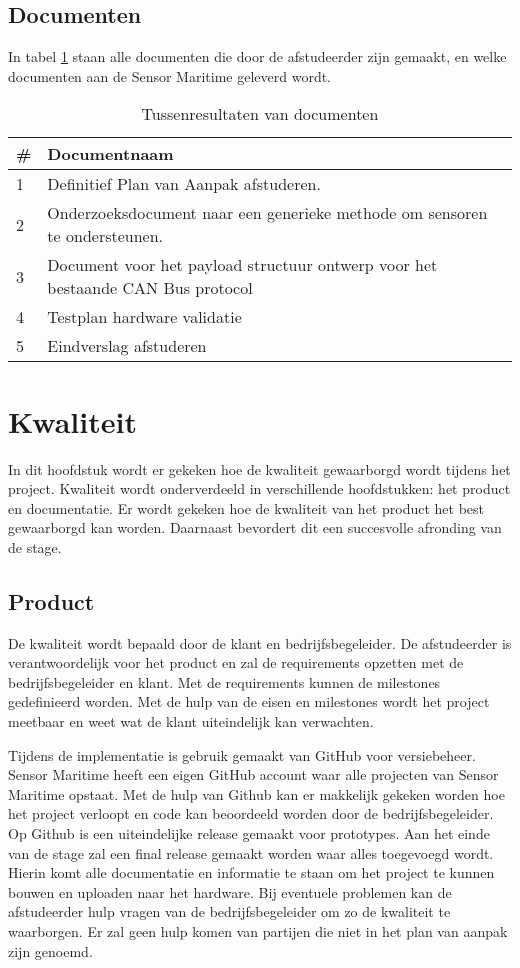 \subsection{Documenten}
In tabel \ref{tab:documents} staan  alle documenten die door de afstudeerder zijn gemaakt, en welke documenten aan de Sensor Maritime geleverd wordt.
\begin{table}[h!] 
	\caption{Tussenresultaten van documenten}
	\begin{tabular}{p{1cm}p{14cm}}
	\toprule
	\textbf{\#} & \textbf{Documentnaam}   \\ \midrule
	1 & Definitief Plan van Aanpak afstuderen. \\
	2 & Onderzoeksdocument naar een generieke methode om sensoren te ondersteunen. \\
	3 & Document voor het payload structuur ontwerp voor het bestaande CAN Bus protocol \\
	4 & Testplan hardware validatie \\
	5 & Eindverslag afstuderen \\ \bottomrule
	\end{tabular}

\label{tab:documents}
\end{table}

\newpage
\section{Kwaliteit}
In dit hoofdstuk wordt er gekeken hoe de kwaliteit gewaarborgd wordt tijdens het project. Kwaliteit wordt onderverdeeld in verschillende hoofdstukken: het product en documentatie. Er wordt gekeken hoe de kwaliteit van het product het best gewaarborgd kan worden. Daarnaast bevordert dit een succesvolle afronding van de stage.

\subsection{Product}
De kwaliteit wordt bepaald door de klant en bedrijfsbegeleider. De afstudeerder is verantwoordelijk voor het product en zal de requirements opzetten met de bedrijfsbegeleider en klant. Met de requirements kunnen de milestones gedefinieerd worden. Met de hulp van de eisen en milestones wordt het project meetbaar en weet wat de klant uiteindelijk kan verwachten. \newline

\noindent Tijdens de implementatie is gebruik gemaakt van GitHub voor versiebeheer. Sensor Maritime heeft een eigen GitHub account waar alle projecten van Sensor Maritime opstaat. Met de hulp van Github kan er makkelijk gekeken worden hoe het project verloopt en code kan beoordeeld worden door de bedrijfsbegeleider. Op Github is een uiteindelijke release gemaakt voor prototypes. Aan het einde van de stage zal een final release gemaakt worden waar alles toegevoegd wordt. Hierin komt alle documentatie en informatie te staan om het project te kunnen bouwen en uploaden naar het hardware. Bij eventuele problemen kan de afstudeerder hulp vragen van de bedrijfsbegeleider om zo de kwaliteit te waarborgen. Er zal geen hulp komen van partijen die niet in het plan van aanpak zijn genoemd.

